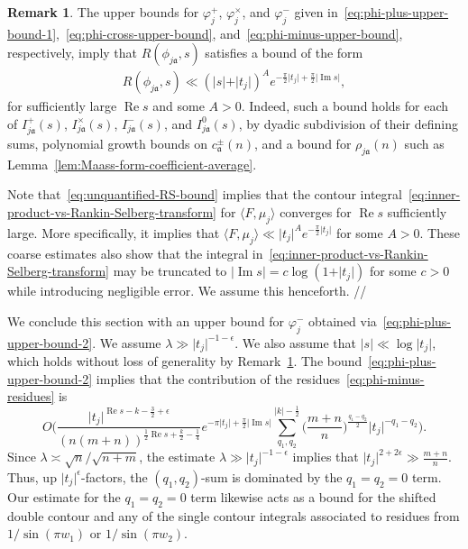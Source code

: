 \documentclass[11pt,reqno]{amsart}
\theoremstyle{plain}
\theoremstyle{definition}
\newtheorem{remark}[theorem]{Remark}
\numberwithin{equation}{section}
\renewcommand{\Im}{\operatorname{Im}}
\renewcommand{\Re}{\operatorname{Re}}
\begin{document}
\begin{remark} \label{rem:coarse-bound}
The upper bounds for $\varphi_j^+$, $\varphi_j^\times$, and $\varphi_j^-$ given in~\eqref{eq:phi-plus-upper-bound-1},~\eqref{eq:phi-cross-upper-bound}, and~\eqref{eq:phi-minus-upper-bound}, respectively, imply that $R(\phi_{j\mathfrak{a}},s)$ satisfies a bound of the form
\begin{align} \label{eq:unquantified-RS-bound}
	R(\phi_{j\mathfrak{a}},s) 
	\ll  (\vert s \vert + \vert t_j \vert)^A 
	e^{-\frac{\pi}{2}\vert t_j \vert + \frac{\pi}{2} \vert \Im s \vert},
\end{align}
for sufficiently large $\Re s$ and some $A>0$. Indeed, such a bound holds for each of $I_{j\mathfrak{a}}^+(s)$, $I_{j\mathfrak{a}}^\times(s)$, $I_{j\mathfrak{a}}^-(s)$, and $I_{j\mathfrak{a}}^0(s)$, by dyadic subdivision of their defining sums, polynomial growth bounds on $c_\mathfrak{a}^\pm(n)$, and a bound for $\rho_{j\mathfrak{a}}(n)$ such as Lemma~\ref{lem:Maass-form-coefficient-average}.

Note that~\eqref{eq:unquantified-RS-bound} implies that the contour integral~\eqref{eq:inner-product-vs-Rankin-Selberg-transform} for $\langle F, \mu_j \rangle$ converges for $\Re s$ sufficiently large. More specifically, it implies that $\langle F, \mu_j \rangle \ll \vert t_j \vert^A e^{-\frac{\pi}{2} \vert t_j \vert}$ for some $A>0$.
These coarse estimates also show that the integral in~\eqref{eq:inner-product-vs-Rankin-Selberg-transform} may be truncated to $\vert \Im s \vert = c \log(1+ \vert t_j \vert)$ for some $c>0$ while introducing negligible error. We assume this henceforth. \hfill //
\end{remark}

We conclude this section with an upper bound for $\varphi_j^-$ obtained via~\eqref{eq:phi-plus-upper-bound-2}. We assume $\lambda \gg \vert t_j \vert^{-1-\epsilon}$. We also assume that $\vert s \vert \ll \log \vert t_j \vert$, which holds without loss of generality by Remark~\ref{rem:coarse-bound}.  
The bound~\eqref{eq:phi-plus-upper-bound-2} implies that the contribution of the residues~\eqref{eq:phi-minus-residues} is
\[
	O\Big(
		\frac{\vert t_j \vert^{\Re s - k - \frac{3}{2} + \epsilon}}
					{(n(m+n))^{\frac{1}{2}\Re s  + \frac{k}{2} - \frac{1}{4}}}
		e^{-\pi \vert t_j \vert + \frac{\pi}{2} \vert \Im s \vert}
		\sum_{q_1,q_2}^{\vert k \vert - \frac{1}{2}} \Big(\frac{m+n}{n} \Big)^{\frac{q_1-q_2}{2}} \vert t_j \vert^{-q_1-q_2}
	\Big).
\]
Since $\lambda \asymp \sqrt{n}/\sqrt{n+m}$, the estimate $\lambda \gg \vert t_j \vert^{-1-\epsilon}$ implies that $\vert t_j \vert^{2+2\epsilon} \gg \frac{m+n}{n}$. Thus, up $\vert t_j \vert^\epsilon$-factors, the $(q_1,q_2)$-sum is dominated by the $q_1 = q_2 =0$ term. Our estimate for the $q_1=q_2=0$ term likewise acts as a bound for the shifted double contour and any of the single contour integrals associated to residues from $1/\sin(\pi w_1)$ or $1/\sin(\pi w_2)$.
\end{document}
